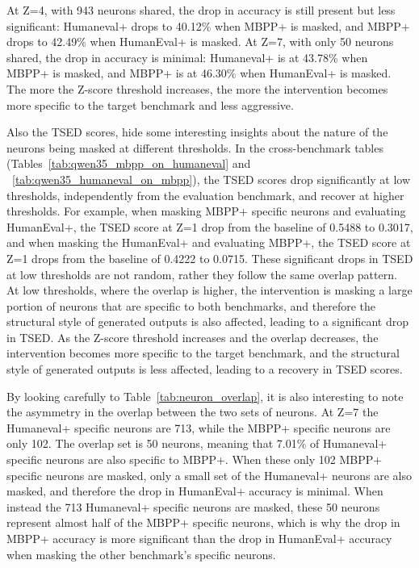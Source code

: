 \documentclass[mscthesis]{usiinfthesis}
\begin{document}
At Z=4, with 943 neurons shared, the drop in accuracy is still present but less significant:
Humaneval+ drops to 40.12\% when MBPP+ is masked, and MBPP+ drops to 42.49\% when HumanEval+ is masked.
At Z=7, with only 50 neurons shared, the drop in accuracy is minimal: Humaneval+ is at 43.78\% when MBPP+ is masked, and MBPP+ is at 46.30\% when HumanEval+ is masked.
The more the Z-score threshold increases, the more the intervention becomes more specific to the target benchmark and less aggressive.
\par\vspace{1em}
Also the TSED scores, hide some interesting insights about the nature of the neurons being masked at different thresholds.
In the cross-benchmark tables (Tables~\ref{tab:qwen35_mbpp_on_humaneval} and ~\ref{tab:qwen35_humaneval_on_mbpp}), the TSED scores drop significantly at low thresholds, 
independently from the evaluation benchmark, and recover at higher thresholds.
For example, when masking MBPP+ specific neurons and evaluating HumanEval+, the TSED score
at Z=1 drop from the baseline of 0.5488 to 0.3017, and when masking the HumanEval+ and evaluating MBPP+, the TSED score 
at Z=1 drops from the baseline of 0.4222 to 0.0715.
These significant drops in TSED at low thresholds are not random, rather they follow the same overlap pattern.
At low thresholds, where the overlap is higher, the intervention is masking a large portion of
neurons that are specific to both benchmarks, and therefore the structural style of 
generated outputs is also affected, leading to a significant drop in TSED.
As the Z-score threshold increases and the overlap decreases, the intervention becomes
more specific to the target benchmark, and the structural style of generated outputs is less affected, leading to a recovery in TSED scores.
\par\vspace{1em}
By looking carefully to Table~\ref{tab:neuron_overlap}, it is also interesting to note
the asymmetry in the overlap between the two sets of neurons.
At Z=7 the Humaneval+ specific neurons are 713, while the MBPP+ specific neurons are only 102.
The overlap set is 50 neurons, meaning that 7.01\% of Humaneval+ specific neurons are also specific to MBPP+.
When these only 102 MBPP+ specific neurons are masked, only a small set of the Humaneval+ neurons are
also masked, and therefore the drop in HumanEval+ accuracy is minimal.
When instead the 713 Humaneval+ specific neurons are masked, these 50 neurons represent
almost half of the MBPP+ specific neurons, which is why the drop in MBPP+ accuracy is more significant than the drop in HumanEval+ accuracy when masking the other benchmark's specific neurons.
\end{document}
